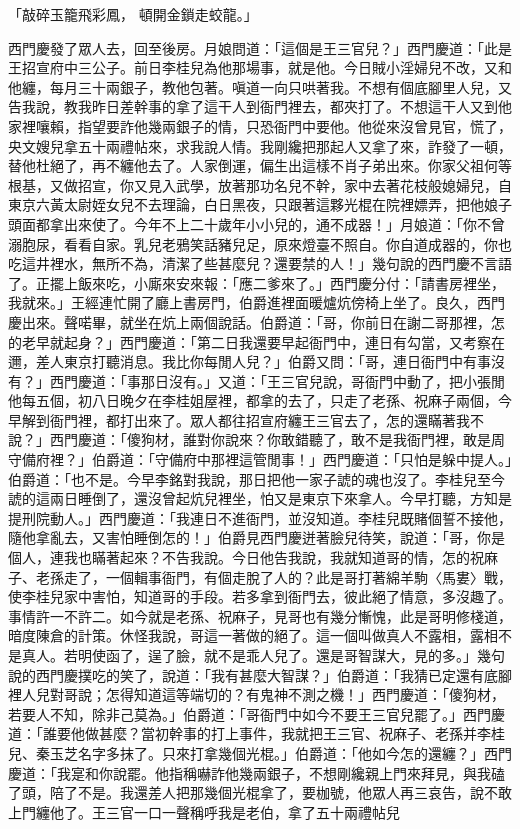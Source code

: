\begin{showcontents}{}
「敲碎玉籠飛彩鳳，  頓開金鎖走蛟龍。」

西門慶發了眾人去，回至後房。月娘問道：「這個是王三官兒？」西門慶道：「此是王招宣府中三公子。前日李桂兒為他那場事，就是他。今日賊小淫婦兒不改，又和他纏，每月三十兩銀子，教他包著。嗔道一向只哄著我。不想有個底腳里人兒，又告我說，教我昨日差幹事的拿了這干人到衙門裡去，都夾打了。不想這干人又到他家裡嚷賴，指望要詐他幾兩銀子的情，只恐衙門中要他。他從來沒曾見官，慌了，央文嫂兒拿五十兩禮帖來，求我說人情。我剛纔把那起人又拿了來，詐發了一頓，替他杜絕了，再不纏他去了。人家倒運，偏生出這樣不肖子弟出來。你家父祖何等根基，又做招宣，你又見入武學，放著那功名兒不幹，家中去著花枝般媳婦兒，自東京六黃太尉姪女兒不去理論，白日黑夜，只跟著這夥光棍在院裡嫖弄，把他娘子頭面都拿出來使了。今年不上二十歲年小小兒的，通不成器！」月娘道：「你不曾溺胞尿，看看自家。乳兒老鴉笑話豬兒足，原來燈臺不照自。你自道成器的，你也吃這井裡水，無所不為，清潔了些甚麼兒？還要禁的人！」幾句說的西門慶不言語了。正擺上飯來吃，小廝來安來報：「應二爹來了。」西門慶分付：「請書房裡坐，我就來。」王經連忙開了廳上書房門，伯爵進裡面暖爐炕傍椅上坐了。良久，西門慶出來。聲喏畢，就坐在炕上兩個說話。伯爵道：「哥，你前日在謝二哥那裡，怎的老早就起身？」西門慶道：「第二日我還要早起衙門中，連日有勾當，又考察在邇，差人東京打聽消息。我比你每閒人兒？」伯爵又問：「哥，連日衙門中有事沒有？」西門慶道：「事那日沒有。」又道：「王三官兒說，哥衙門中動了，把小張閒他每五個，初八日晚夕在李桂姐屋裡，都拿的去了，只走了老孫、祝麻子兩個，今早解到衙門裡，都打出來了。眾人都往招宣府纏王三官去了，怎的還瞞著我不說？」西門慶道：「傻狗材，誰對你說來？你敢錯聽了，敢不是我衙門裡，敢是周守備府裡？」伯爵道：「守備府中那裡這管閒事！」西門慶道：「只怕是躲中提人。」伯爵道：「也不是。今早李銘對我說，那日把他一家子諕的魂也沒了。李桂兒至今諕的這兩日睡倒了，還沒曾起炕兒裡坐，怕又是東京下來拿人。今早打聽，方知是提刑院動人。」西門慶道：「我連日不進衙門，並沒知道。李桂兒既賭個誓不接他，隨他拿亂去，又害怕睡倒怎的！」伯爵見西門慶迸著臉兒待笑，說道：「哥，你是個人，連我也瞞著起來？不告我說。今日他告我說，我就知道哥的情，怎的祝麻子、老孫走了，一個輯事衙門，有個走脫了人的？此是哥打著綿羊駒〈馬婁〉戰，使李桂兒家中害怕，知道哥的手段。若多拿到衙門去，彼此絕了情意，多沒趣了。事情許一不許二。如今就是老孫、祝麻子，見哥也有幾分慚愧，此是哥明修棧道，暗度陳倉的計策。休怪我說，哥這一著做的絕了。這一個叫做真人不露相，露相不是真人。若明使函了，逞了臉，就不是乖人兒了。還是哥智謀大，見的多。」幾句說的西門慶撲吃的笑了，說道：「我有甚麼大智謀？」伯爵道：「我猜已定還有底腳裡人兒對哥說；怎得知道這等端切的？有鬼神不測之機！」西門慶道：「傻狗材，若要人不知，除非己莫為。」伯爵道：「哥衙門中如今不要王三官兒罷了。」西門慶道：「誰要他做甚麼？當初幹事的打上事件，我就把王三官、祝麻子、老孫并李桂兒、秦玉芝名字多抹了。只來打拿幾個光棍。」伯爵道：「他如今怎的還纏？」西門慶道：「我寔和你說罷。他指稱嚇詐他幾兩銀子，不想剛纔親上門來拜見，與我磕了頭，陪了不是。我還差人把那幾個光棍拿了，要枷號，他眾人再三哀告，說不敢上門纏他了。王三官一口一聲稱呼我是老伯，拿了五十兩禮帖兒
\end{showcontents}
